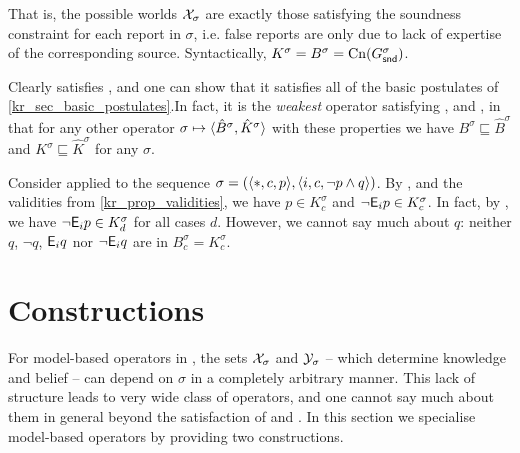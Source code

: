 That is, the possible worlds $\mathcal{X}_\sigma$ are
exactly those satisfying the soundness constraint for each report in
$\sigma$, i.e. false reports are only due to lack of expertise of the
corresponding source.
%
Syntactically, $K^\sigma = B^\sigma = \operatorname{Cn}(G^\sigma_{\mathsf{snd}})$.

Clearly \weakop{} satisfies \soundness{}, and one
can show that it satisfies all of the basic postulates of
\cref{kr_sec_basic_postulates}.\footnotemark In fact, it is the \emph{weakest}
operator satisfying \closure{}, \containment{} and \soundness{}, in that
for any other operator $\sigma \mapsto \langle {\hat{B}^\sigma,
\hat{K}^\sigma} \rangle$ with these properties we have $B^\sigma \sqsubseteq
\hat{B}^\sigma$ and $K^\sigma \sqsubseteq \hat{K}^\sigma$ for any $\sigma$.

\begin{example}
\label{kr_ex_model_based}
    Consider \weakop{} applied to the sequence
    $
        \sigma
        = (\langle {\ast, c, p} \rangle, \langle {i, c, \neg p \land q} \rangle)
    $.
    By \soundness{}, \closure{} and the validities from \cref{kr_prop_validities},
    we have $p \in K^\sigma_c$ and $\neg \mathsf{E}_i{p} \in K^\sigma_c$. In fact, by
    \closure{}, we
    have $\neg \mathsf{E}_i{p} \in K^\sigma_d$ for all cases $d$.
    However, we cannot say much about $q$: neither $q$, $\neg q$, $\mathsf{E}_i{q}$ nor
    $\neg \mathsf{E}_i{q}$ are in $B^\sigma_c = K^\sigma_c$.

\end{example}

\section{Constructions}
\label{kr_sec_constructions}

For model-based operators in , the sets $\mathcal{X}_\sigma$ and
$\mathcal{Y}_\sigma$ -- which determine knowledge and belief -- can
depend on $\sigma$ in a completely arbitrary manner. This lack of structure
leads to very wide class of operators, and one cannot say much about them in
general beyond the satisfaction of \closure{} and \containment{}. In this
section we specialise model-based operators by providing two constructions.

